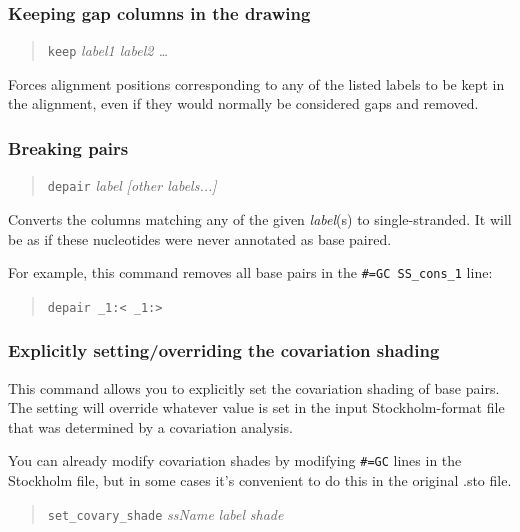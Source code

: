 \documentclass[letterpaper,12pt]{report}
\newcommand{\example}[1]{
\begin{quote}
{\raggedright
#1
}
\end{quote}
}
\begin{document}
\subsubsection{Keeping gap columns in the drawing}
\example{{\tt keep} \textit{label1  label2 {\dots}}}

Forces alignment positions corresponding to any of the listed labels to
be kept in the alignment, even if they would normally be considered
gaps and removed.

\subsubsection{Breaking pairs}

\example{{\tt depair} {\it label} {\it [other labels...]}}

Converts the columns matching any of the given {\it label}(s) to single-stranded.  It will be as if these nucleotides were never annotated as base paired.

For example, this command removes all base pairs in the {\tt \#=GC SS\_cons\_1} line:
\example{{\tt depair \_1:{\textless} \_1:{\textgreater}}}

\subsubsection{Explicitly setting/overriding the covariation shading}
\label{sec:setcovaryshade}

This command allows you to explicitly set the covariation shading of base pairs.  The setting will override whatever value is set in the input Stockholm-format file that was determined by a covariation analysis.

You can already modify covariation shades by modifying {\tt \#=GC} lines in the Stockholm file, but in some cases it's convenient to do this in the original .sto file.

\example{
{\tt set\_covary\_shade} {\it ssName} {\it label} {\it shade}
}
\end{document}

